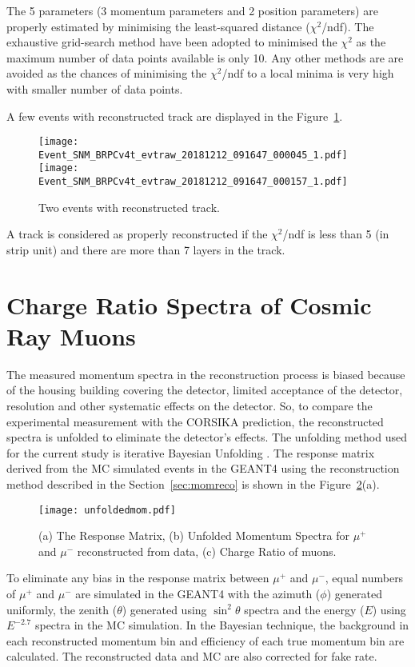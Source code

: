 The 5 parameters (3 momentum parameters and 2 position parameters) are
properly estimated by minimising the least-squared distance
($\chi^{2}$/ndf).
The exhaustive grid-search method have been adopted to minimised the
$\chi^{2}$ as the maximum number of data points available is only 10.
Any other methods are are avoided as the chances of minimising the
$\chi^{2}$/ndf to a local minima is very high with smaller number of
data points.

A few events with reconstructed track are displayed in the
Figure~\ref{fig:eventdisplay}.
\begin{figure}[h]
  \texttt{[image: Event\_SNM\_BRPCv4t\_evtraw\_20181212\_091647\_000045\_1.pdf]}
  \texttt{[image: Event\_SNM\_BRPCv4t\_evtraw\_20181212\_091647\_000157\_1.pdf]}
  \caption{Two events with reconstructed track.}
  \label{fig:eventdisplay}
\end{figure}
A track is considered as properly reconstructed if the $\chi^{2}$/ndf
is less than 5 (in strip unit) and there are more than 7 layers in
the track.

\section{Charge Ratio Spectra of Cosmic Ray Muons}
\label{section:multiresult}
The measured momentum spectra in the reconstruction process is biased
because of the housing building covering the detector, limited
acceptance of the detector, resolution and other systematic effects
on the detector. So, to compare the experimental measurement with the
CORSIKA prediction, the reconstructed spectra is unfolded to eliminate
the detector's effects.
The unfolding method used for the current study is iterative
Bayesian Unfolding \cite{bayesian}.
The response matrix derived from the MC simulated events in the
GEANT4 using the reconstruction method described in the
Section~\ref{sec:momreco} is shown in the
Figure~\ref{fig:unfolddata}(a).
\begin{figure}[h]
  \texttt{[image: unfoldedmom.pdf]}
  \caption{(a) The Response Matrix, (b) Unfolded Momentum Spectra for
    $\mu^{+}$ and $\mu^{-}$ reconstructed from data, (c) Charge Ratio
    of muons.}
  \label{fig:unfolddata}
\end{figure}
To eliminate any bias in the response matrix between $\mu^{+}$ and
$\mu^{-}$, equal numbers of $\mu^{+}$ and $\mu^{-}$ are simulated in
the GEANT4 with the azimuth ($\phi$) generated uniformly, the zenith
($\theta$) generated using $\sin^{2} \theta$ spectra and the energy
($E$) using $E^{-2.7}$ spectra in the MC simulation.
In the Bayesian technique, the background in each reconstructed
momentum bin and efficiency of each true momentum bin are calculated.
The reconstructed data and MC are also corrected for fake rate.

